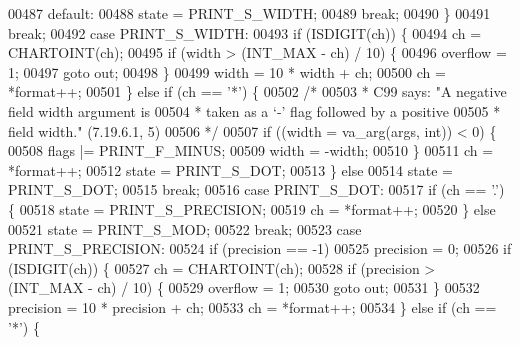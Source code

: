 \begin{DoxyCode}
{{00487             \textcolor{keywordflow}{default}:
00488                 state = PRINT\_S\_WIDTH;
00489                 \textcolor{keywordflow}{break};
00490             \}
00491             \textcolor{keywordflow}{break};
00492         \textcolor{keywordflow}{case} PRINT\_S\_WIDTH:
00493             \textcolor{keywordflow}{if} (ISDIGIT(ch)) \{
00494                 ch = CHARTOINT(ch);
00495                 \textcolor{keywordflow}{if} (width > (INT\_MAX - ch) / 10) \{
00496                     overflow = 1;
00497                     \textcolor{keywordflow}{goto} out;
00498                 \}
00499                 width = 10 * width + ch;
00500                 ch = *format++;
00501             \} \textcolor{keywordflow}{else} \textcolor{keywordflow}{if} (ch == \textcolor{charliteral}{'*'}) \{
00502                 \textcolor{comment}{/*}
00503 \textcolor{comment}{                 * C99 says: "A negative field width argument is}
00504 \textcolor{comment}{                 * taken as a `-' flag followed by a positive}
00505 \textcolor{comment}{                 * field width." (7.19.6.1, 5)}
00506 \textcolor{comment}{                 */}
00507                 \textcolor{keywordflow}{if} ((width = va\_arg(args, \textcolor{keywordtype}{int})) < 0) \{
00508                     flags |= PRINT\_F\_MINUS;
00509                     width = -width;
00510                 \}
00511                 ch = *format++;
00512                 state = PRINT\_S\_DOT;
00513             \} \textcolor{keywordflow}{else}
00514                 state = PRINT\_S\_DOT;
00515             \textcolor{keywordflow}{break};
00516         \textcolor{keywordflow}{case} PRINT\_S\_DOT:
00517             \textcolor{keywordflow}{if} (ch == \textcolor{charliteral}{'.'}) \{
00518                 state = PRINT\_S\_PRECISION;
00519                 ch = *format++;
00520             \} \textcolor{keywordflow}{else}
00521                 state = PRINT\_S\_MOD;
00522             \textcolor{keywordflow}{break};
00523         \textcolor{keywordflow}{case} PRINT\_S\_PRECISION:
00524             \textcolor{keywordflow}{if} (precision == -1)
00525                 precision = 0;
00526             \textcolor{keywordflow}{if} (ISDIGIT(ch)) \{
00527                 ch = CHARTOINT(ch);
00528                 \textcolor{keywordflow}{if} (precision > (INT\_MAX - ch) / 10) \{
00529                     overflow = 1;
00530                     \textcolor{keywordflow}{goto} out;
00531                 \}
00532                 precision = 10 * precision + ch;
00533                 ch = *format++;
00534             \} \textcolor{keywordflow}{else} \textcolor{keywordflow}{if} (ch == \textcolor{charliteral}{'*'}) \{
}}
\end{DoxyCode}

